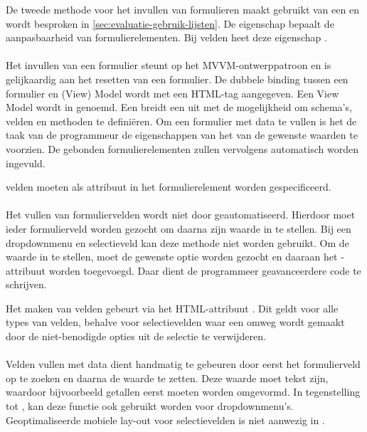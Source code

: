 De tweede methode voor het invullen van formulieren maakt gebruikt van een  en wordt besproken in \ref{sec:evaluatie-gebruik-lijsten}.
De  eigenschap bepaalt de aanpasbaarheid van formulierelementen.
Bij velden heet deze eigenschap .


\paragraph{\kendo}
Het invullen van een formulier steunt op het MVVM-ontwerppatroon en is gelijkaardig aan het resetten van een formulier.
De dubbele binding tussen een formulier en (View) Model wordt met een HTML-tag aangegeven.
Een View Model wordt in \kendo{}  genoemd.
Een  breidt een  uit met de mogelijkheid om schema's,  velden en methoden te definiëren.  
Om een formulier met data te vullen is het de taak van de programmeur de eigenschappen van het  van de gewenste waarden te voorzien.
De gebonden formulierelementen zullen vervolgens automatisch worden ingevuld.

 velden moeten als attribuut in het formulierelement worden gespecificeerd.

\paragraph{\jqm}
Het vullen van formuliervelden wordt niet door \jqm{} geautomatiseerd.
Hierdoor moet ieder formulierveld worden gezocht om daarna zijn waarde in te stellen.
Bij een dropdownmenu en selectieveld kan deze methode niet worden gebruikt.
Om de waarde in te stellen, moet de gewenste optie worden gezocht en daaraan het -attribuut worden toegevoegd.
Daar dient de programmeer geavanceerdere code te schrijven.

Het  maken van velden gebeurt via het HTML-attribuut .
Dit geldt voor alle types van velden, behalve voor selectievelden waar een omweg wordt gemaakt door de niet-benodigde opties uit de selectie te verwijderen.

\paragraph{\lungo}
Velden vullen met data dient handmatig te gebeuren door eerst het formulierveld op te zoeken en daarna de waarde te zetten.
Deze waarde moet tekst zijn, waardoor bijvoorbeeld getallen eerst moeten worden omgevormd.
In tegenstelling tot \jqm{}, kan deze functie ook gebruikt worden voor dropdownmenu's.
Geoptimaliseerde mobiele lay-out voor selectievelden is niet aanwezig in \lungo.

